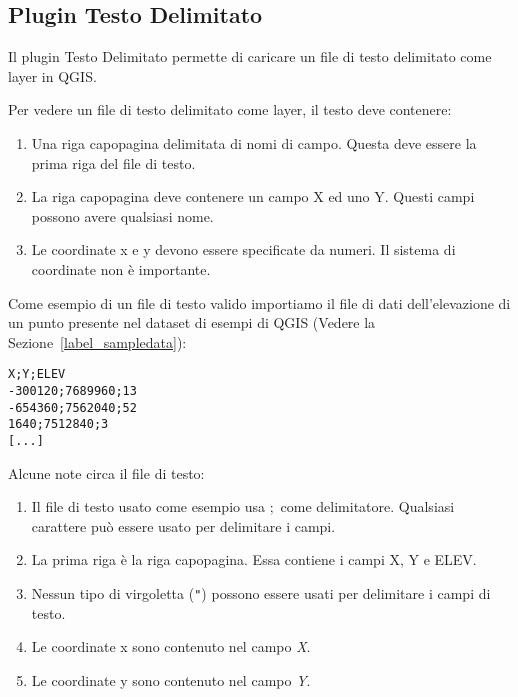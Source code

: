 
\subsection{Plugin Testo Delimitato}\label{label_dltext}    


Il plugin Testo Delimitato permette di caricare un file di testo delimitato come layer in QGIS.


Per vedere un file di testo delimitato come layer, il testo deve contenere:

\begin{enumerate}      
\item Una riga capopagina delimitata di nomi di campo. Questa deve essere la prima riga del file di testo.
\item La riga capopagina deve contenere un campo X ed uno Y. Questi campi possono avere qualsiasi nome.
\item Le coordinate x e y devono essere specificate da numeri. Il sistema di coordinate non è importante.
\end{enumerate}

Come esempio di un file di testo valido importiamo il file di dati dell'elevazione di un punto  presente nel dataset di esempi di QGIS (Vedere la Sezione~\ref{label_sampledata}):

\begin{verbatim} 
X;Y;ELEV
-300120;7689960;13
-654360;7562040;52
1640;7512840;3
[...]
\end{verbatim}

Alcune note circa il file di testo:

\begin{enumerate}
\item Il file di testo usato come esempio usa \mbox{$;$} come delimitatore. Qualsiasi carattere può essere usato per delimitare i campi.
\item La prima riga è la riga capopagina. Essa contiene i campi X, Y e ELEV.
\item Nessun tipo di virgoletta ({\tt{}"{}}) possono essere usati per delimitare i campi di testo.
\item Le coordinate x sono contenuto nel campo {\em X}.
\item Le coordinate y sono contenuto nel campo {\em Y}.
\end{enumerate}

